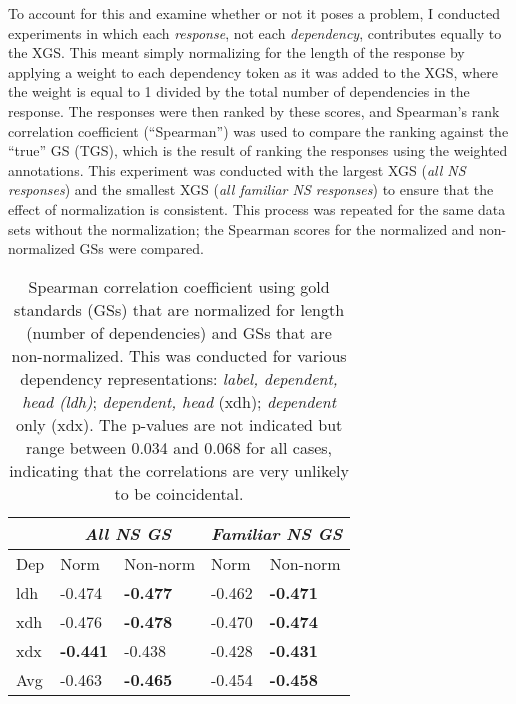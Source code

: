 To account for this and examine whether or not it poses a problem, I conducted experiments in which each \textit{response}, not each \textit{dependency}, contributes equally to the XGS. This meant simply normalizing for the length of the response by applying a weight to each dependency token as it was added to the XGS, where the weight is equal to 1 divided by the total number of dependencies in the response. The responses were then ranked by these scores, and Spearman's rank correlation coefficient (``Spearman'') was used to compare the ranking against the ``true'' GS (TGS), which is the result of ranking the responses using the weighted annotations. This experiment was conducted with the largest XGS (\textit{all NS responses}) and the smallest XGS (\textit{all familiar NS responses}) to ensure that the effect of normalization is consistent.  This process was repeated for the same data sets without the normalization; the Spearman scores for the normalized and non-normalized GSs were compared.

\begin{table}[htb!]
\begin{center}
\begin{tabular}{|l||l|l||l|l|}
\hline
 & \multicolumn{2}{|c||}{\textit{All NS GS}} & \multicolumn{2}{|c|}{\textit{Familiar NS GS}} \\
\hline
 Dep & Norm & Non-norm & Norm & Non-norm \\
\hline
\hline
ldh & -0.474 & \textbf{-0.477} & -0.462 & \textbf{-0.471} \\
\hline
xdh & -0.476 & \textbf{-0.478} & -0.470 & \textbf{-0.474} \\
\hline
xdx & \textbf{-0.441} & -0.438 & -0.428 & \textbf{-0.431} \\
\hline
Avg & -0.463 & \textbf{-0.465} & -0.454 & \textbf{-0.458} \\
\hline
\end{tabular}
\caption{\label{tab:normalize-responses-spearman} Spearman correlation coefficient using gold standards (GSs) that are normalized for length (number of dependencies) and GSs that are non-normalized. This was conducted for various dependency representations: \textit{label, dependent, head (ldh)}; \textit{dependent, head} (xdh); \textit{dependent} only (xdx). The p-values are not indicated but range between 0.034 and 0.068 for all cases, indicating that the correlations are very unlikely to be coincidental.}
\end{center}
\end{table}

